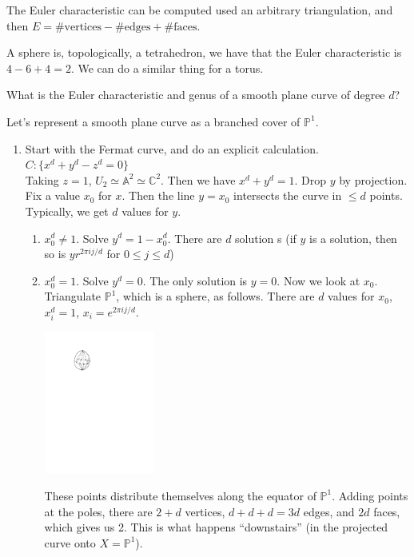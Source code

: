 \documentclass [letterpaper,11pt,twoside] {article}
\begin{document}
    The Euler characteristic can be computed used an arbitrary triangulation, and then $E = \text{\# vertices} - \text{\# edges} + \text{\# faces}$.

    A sphere is, topologically, a tetrahedron, we have that the Euler characteristic is $4 - 6 + 4 = 2$.  We can do a similar thing for a torus.

    What is the Euler characteristic and genus of a smooth plane curve of degree $d$?

    Let's represent a smooth plane curve as a branched cover of $\mathbb P^1$.

    \begin{enumerate}[{Method }I]
      \item Start with the Fermat curve, and do an explicit calculation.  $C: \{x^d + y^d - z^d = 0\}$ \\
        Taking $z = 1$, $U_2 \simeq \mathbb A^2 \simeq \mathbb C^2$.  Then we have $x^d + y^d = 1$.  Drop $y$ by projection.
        Fix a value $x_0$ for $x$.  Then the line $y = x_0$ intersects the curve in $\le d$ points.
        Typically, we get $d$ values for $y$.
        \begin{enumerate}[{Case }I]
          \item $x_0^d \ne 1$.  Solve $y^d = 1 - x_0^d$.  There are $d$ solution s (if $y$ is a solution, then so is $yr^{2 \pi i j / d}$ for $0 \le j \le d$)
          \item $x_0^d = 1$.  Solve $y^d = 0$.  The only solution is $y = 0$. Now we look at $x_0$.  Triangulate $\mathbb P^1$, which is a sphere, as follows.  There are $d$ values for $x_0$, $x_i^d = 1$, $x_i = e^{2\pi i j / d}$.
      \begin{center}\includegraphics[width=0.3\textwidth]{2011-02-14_Diagram_001}\end{center}
          These points distribute themselves along the equator of $\mathbb P^1$.  Adding points at the poles, there are $2 + d$ vertices, $d + d + d = 3d$ edges, and $2d$ faces, which gives us 2. This is what happens ``downstairs'' (in the projected curve onto $X = \mathbb P^1$).\\

\end{enumerate}
\end{enumerate}
\end{document}
